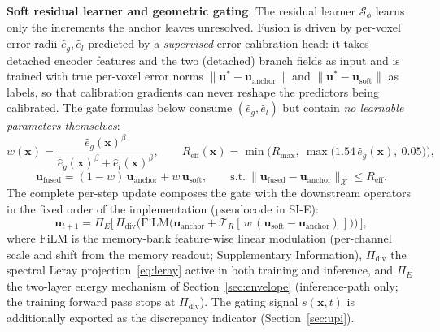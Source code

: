 \documentclass[11pt,a4paper]{article}
\newcommand{\bu}{\bm{u}}
\newcommand{\cS}{\mathcal{S}}
\newcommand{\cX}{\mathcal{X}}
\newcommand{\cT}{\mathcal{T}}
\begin{document}
\textbf{Soft residual learner and geometric gating}. The residual learner $\cS_\phi$ learns only the increments the anchor leaves unresolved. Fusion is driven by per-voxel error radii $\hat e_g,\hat e_l$ predicted by a \emph{supervised} error-calibration head: it takes detached encoder features and the two (detached) branch fields as input and is trained with true per-voxel error norms $\|\bu^*-\bu_{\mathrm{anchor}}\|$ and $\|\bu^*-\bu_{\mathrm{soft}}\|$ as labels, so that calibration gradients can never reshape the predictors being calibrated. The gate formulas below consume $(\hat e_g,\hat e_l)$ but contain \emph{no learnable parameters themselves}:
\begin{equation}
w(\bm{x})=\frac{\hat e_g(\bm{x})^{\beta}}{\hat e_g(\bm{x})^{\beta}+\hat e_l(\bm{x})^{\beta}},\qquad
R_{\mathrm{eff}}(\bm{x})=\min\!\Big(R_{\max},\ \max\big(1.54\,\hat e_g(\bm{x}),\ 0.05\big)\Big),
\label{eq:gate}
\end{equation}
\begin{equation}
\bu_{\mathrm{fused}}=(1-w)\,\bu_{\mathrm{anchor}}+w\,\bu_{\mathrm{soft}},\qquad
\text{s.t.}\ \|\bu_{\mathrm{fused}}-\bu_{\mathrm{anchor}}\|_{\cX}\le R_{\mathrm{eff}} .
\label{eq:fusion}
\end{equation}
The complete per-step update composes the gate with the downstream operators in the fixed order of the implementation (pseudocode in SI-E):
\begin{equation}
\bu_{t+1}=\Pi_{E}\!\Big[\,\Pi_{\mathrm{div}}\Big(\mathrm{FiLM}\big(\bu_{\mathrm{anchor}}+\cT_R[\,w\,(\bu_{\mathrm{soft}}-\bu_{\mathrm{anchor}})\,]\big)\Big)\,\Big],
\label{eq:update}
\end{equation}
where $\mathrm{FiLM}$ is the memory-bank feature-wise linear modulation (per-channel scale and shift from the memory readout; Supplementary Information), $\Pi_{\mathrm{div}}$ the spectral Leray projection~\eqref{eq:leray} active in both training and inference, and $\Pi_{E}$ the two-layer energy mechanism of Section~\ref{sec:envelope} (inference-path only; the training forward pass stops at $\Pi_{\mathrm{div}}$).
The gating signal $s(\bm{x},t)$ is additionally exported as the discrepancy indicator (Section~\ref{sec:upi}).
\end{document}
